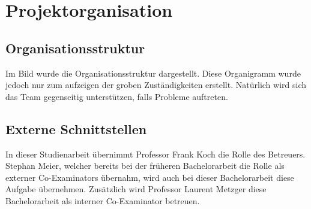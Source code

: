 \section{Projektorganisation}

\subsection{Organisationsstruktur}

\noindent Im Bild wurde die Organisationsstruktur dargestellt. Diese Organigramm wurde jedoch nur zum aufzeigen der groben Zuständigkeiten erstellt. Natürlich wird sich das Team gegenseitig unterstützen, falls Probleme auftreten.

\subsection{Externe Schnittstellen}
In dieser Studienarbeit übernimmt Professor Frank Koch die Rolle des Betreuers. Stephan Meier, welcher bereits bei der früheren Bachelorarbeit die Rolle als externer Co-Examinators übernahm, wird auch bei dieser Bachelorarbeit diese Aufgabe übernehmen. Zusätzlich wird Professor Laurent Metzger diese Bachelorarbeit als interner Co-Examinator betreuen.


\newpage